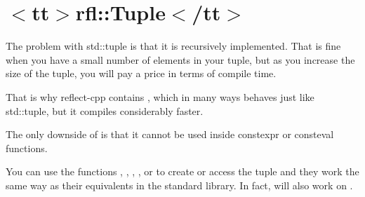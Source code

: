 \chapter{\texorpdfstring{$<$}{<}tt\texorpdfstring{$>$}{>}rfl\+::Tuple\texorpdfstring{$<$}{<}/tt\texorpdfstring{$>$}{>}}
\hypertarget{md_external_2reflect-cpp_2docs_2rfl__tuple}{}\label{md_external_2reflect-cpp_2docs_2rfl__tuple}
\label{md_external_2reflect-cpp_2docs_2rfl__tuple_autotoc_md629}%
%


The problem with {\ttfamily std\+::tuple} is that it is recursively implemented. That is fine when you have a small number of elements in your tuple, but as you increase the size of the tuple, you will pay a price in terms of compile time.

That is why reflect-\/cpp contains {\ttfamily {}}, which in many ways behaves just like {\ttfamily std\+::tuple}, but it compiles considerably faster.

The only downside of {\ttfamily {}} is that it cannot be used inside {\ttfamily constexpr} or {\ttfamily consteval} functions.

You can use the functions {\ttfamily {}}, {\ttfamily {}}, {\ttfamily {}}, {\ttfamily {}}, {\ttfamily {}} or {\ttfamily {}} to create or access the tuple and they work the same way as their equivalents in the standard library. In fact, {\ttfamily {}} will also work on {\ttfamily {}}. 